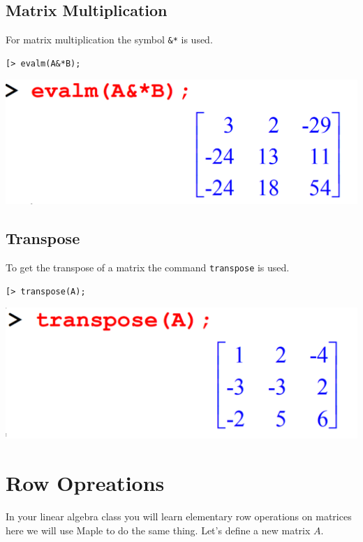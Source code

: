 \documentclass[
]{book}
\theoremstyle{definition}
\theoremstyle{definition}
\theoremstyle{definition}
\theoremstyle{definition}
\theoremstyle{remark}
\begin{document}
\subsection{Matrix Multiplication}\label{matrix-multiplication}

For matrix multiplication the symbol \texttt{\&*} is used.

\begin{verbatim}
[> evalm(A&*B);
\end{verbatim}

\includegraphics{figures/Lesson 4/fig26.png}

\subsection{Transpose}\label{transpose}

To get the transpose of a matrix the command \texttt{transpose} is used.

\begin{verbatim}
[> transpose(A);
\end{verbatim}

\includegraphics{figures/Lesson 4/fig27.png}

\section{Row Opreations}\label{row-opreations}

In your linear algebra class you will learn elementary row operations on matrices here we will use Maple to do the same thing.
Let's define a new matrix \(A\).
\end{document}

